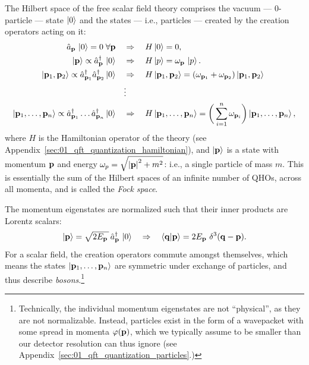 The Hilbert space of the free scalar field theory comprises the vacuum --- 0-particle --- state $\ket{0}$ and the states --- i.e., particles --- created by the creation operators acting on it:
\begin{equation}
    \label{eq:01_qft_quantization_hamiltonian_states}
    \begin{split}
		\hat a_{\mathbf{p}}\, \ket{0} = 0\; \forall \mathbf{p} \quad &\Rightarrow \quad H\ket{0} = 0, \\
        \ket{\mathbf{p}} \propto \hat a^\dagger_{\mathbf{p}}\,\ket{0} \quad &\Rightarrow \quad H\ket{p} = \omega_{\mathbf{p}}\,\ket{p}. \\
        \ket{\mathbf{p}_1, \mathbf{p}_2} \propto \hat a^\dagger_{\mathbf{p}_1}\hat a^\dagger_{\mathbf{p}_2}\ket{0} \quad &\Rightarrow \quad H\ket{\mathbf{p}_1, \mathbf{p}_2} = (\omega_{\mathbf{p}_1} + \omega_{\mathbf{p}_2})\ket{\mathbf{p}_1, \mathbf{p}_2} \\
        &\vdots \\
        \ket{\mathbf{p}_1, \ldots, \mathbf{p}_n} \propto \hat a^\dagger_{\mathbf{p}_1} \ldots\hat a^\dagger_{\mathbf{p}_n}\ket{0} \quad &\Rightarrow \quad H\ket{\mathbf{p}_1, \ldots, \mathbf{p}_n} = \bigg(\sum_{i=1}^n \omega_{\mathbf{p}_i}\bigg) \ket{\mathbf{p}_1,  \ldots, \mathbf{p}_n},
    \end{split}
\end{equation}
where $H$ is the Hamiltonian operator of the theory (see Appendix~\ref{sec:01_qft_quantization_hamiltonian}), and $\ket{\mathbf{p}}$ is a state with momentum $\mathbf{p}$ and energy $\omega_p = \sqrt{\left\lvert \mathbf{p} \right\rvert^2 + m^2}$: i.e., a single particle of mass $m$.
This is essentially the sum of the Hilbert spaces of an infinite number of QHOs, across all momenta, and is called the \textit{Fock space}.

The momentum eigenstates are normalized such that their inner products are Lorentz scalars:
\begin{equation}
	\label{eq:01_qft_quantization_normalization}
	\ket{\mathbf{p}} = \sqrt{2E_{\mathbf{p}}\,}\, \hat a^\dagger_{\mathbf{p}}\, \ket{0} \quad \Rightarrow \quad \braket{\mathbf{q}|\mathbf{p}} = 2E_{\mathbf{p}}\,\, \delta^3(\mathbf{q} - \mathbf{p}).
\end{equation}
For a scalar field, the creation operators commute amongst themselves, which means the states $\ket{\mathbf{p}_1, \ldots, \mathbf{p}_n}$ are symmetric under exchange of particles, and thus describe \textit{bosons}.\footnote{Technically, the individual momentum eigenstates are not ``physical'', as they are not normalizable. Instead, particles exist in the form of a wavepacket with some spread in momenta $\varphi(\mathbf{p})$, which we typically assume to be smaller than our detector resolution can thus ignore (see Appendix~\ref{sec:01_qft_quantization_particles}.)}

